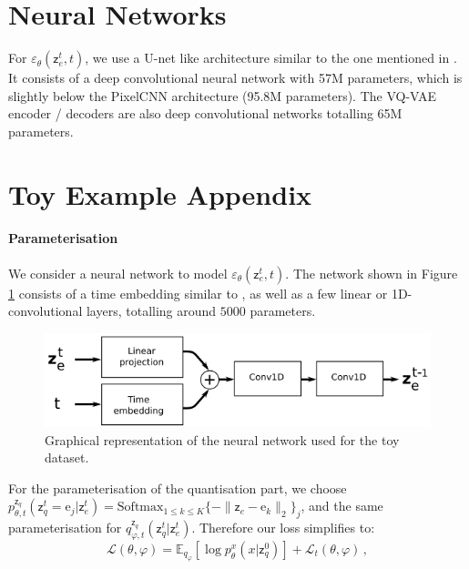 \documentclass[nohyperref]{article}
\theoremstyle{plain}
\theoremstyle{definition}
\theoremstyle{remark}
\newcommand{\latentcont}{\mathsf{z}_e}
\newcommand{\latentdis}{\mathsf{z}_q}
\newcommand{\rme}{\mathrm{e}}
\newcommand{\embed}{\rme}
\begin{document}
\section{Neural Networks}
\label{ap:networks}
For $\varepsilon_\theta(\latentcont^t ,t)$, we use a U-net like architecture similar to the one mentioned in \cite{ho2020denoising}. It consists of a deep convolutional neural network with 57M parameters, which is slightly below the PixelCNN architecture (95.8M parameters). The VQ-VAE encoder / decoders are also deep convolutional networks totalling 65M parameters.

\section{Toy Example Appendix}
\label{ap:additionaltoy}

\paragraph{Parameterisation}

We consider a neural network to model  $\varepsilon_\theta(\latentcont^t ,t)$. The network shown in Figure  \ref{ap:fig:toynetwork} consists of a time embedding similar to \cite{ho2020denoising}, as well as a few linear or 1D-convolutional layers, totalling around $5000$ parameters.

\begin{figure}[h!]
    \centering
    \includegraphics[scale=2.0]{images/network_toy.png}
    \caption{Graphical representation of the neural network used for the toy dataset.}
    \label{ap:fig:toynetwork}
\end{figure}

For the parameterisation of the quantisation part, we choose $p_{\theta,t}^{\latentdis}(\latentdis^{t}=\embed_j|\latentcont^{t}) = \mathrm{Softmax}_{1\leq k \leq K}\{-\|\latentcont - \embed_k\|_2\}_j$, and the same parameterisation for $q_{\varphi,t}^{\latentdis}(\latentdis^{t}|\latentcont^{t})$. Therefore our loss simplifies to:
$$
\mathcal{L}(\theta,\varphi) = \mathbb{E}_{q_{\varphi}}\left[\log p^x_{\theta}(x|\latentdis^{0})\right] +  \mathcal{L}_t(\theta,\varphi)\,,
$$
\end{document}
